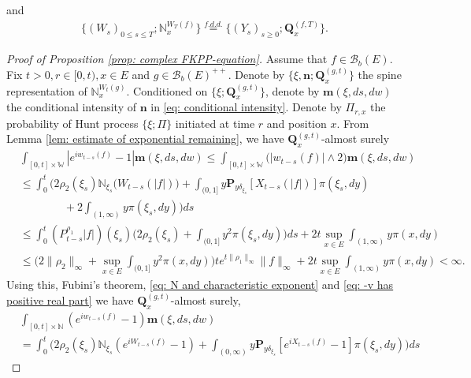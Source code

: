 \documentclass[12pt,a4paper]{amsart}
\theoremstyle{plain}
\theoremstyle{definition}
\numberwithin{equation}{section}
\begin{document}
    and
\begin{equation}\begin{split}
\label{eq: Spine decomposition 2}
    \{(W_s)_{0\leq s\leq T};\mathbb N_x^{W_T(f)}\}
    \overset{f.d.d.}{=} \{(Y_s)_{s \geq 0};\mathbf Q_x^{(f,T)}\}.
\end{split}\end{equation}

\begin{proof}[Proof of Proposition \ref{prop: complex FKPP-equation}]
    Assume that $f\in \mathcal B_b(E)$.
    Fix $t>0, r\in [0,t), x\in E$ and $g\in \mathcal B_b(E)^{++}$.
    Denote by $\{\xi, \mathbf n; \mathbf Q_x^{(g,t)}\}$ the spine representation of $\mathbb N_x^{W_t(g)}$.
    Conditioned on $\{\xi; \mathbf Q_x^{(g,t)}\}$, denote by $\mathbf m(\xi, ds,dw)$ the conditional intensity of $\mathbf n$ in \eqref{eq: conditional intensity}.
    Denote by $\Pi_{r,x}$ the probability of Hunt process $\{\xi; \Pi\}$ initiated at time $r$ and position $x$.
    From Lemma \ref{lem: estimate of exponential remaining}, we have $\mathbf Q^{(g,t)}_{x}$-almost surely
\begin{equation}\begin{split}
&\int_{[0,t]\times \mathbb W}|e^{i w_{t-s}(f)} - 1| \mathbf m(\xi, ds,dw)
    \leq \int_{[0,t]\times \mathbb W}\big(| w_{t-s}(f)| \wedge 2\big) \mathbf m(\xi, ds,dw)
    \\&\leq \int_0^t \Big(2\rho_2(\xi_s)\mathbb N_{\xi_s}\big( W_{t-s}(|f|)\big)  + \int_{(0,1]} y \mathbf P_{y \delta_{\xi_s}}[ X_{t-s}(|f|)] \pi(\xi_s,dy)
    \\&\qquad\qquad+ 2\int_{(1,\infty)}y\pi(\xi_s,dy)\Big) ds
     \\&\leq \int_0^t (P_{t-s}^{\rho_1} |f|)(\xi_s)\Big(2\rho_2(\xi_s)  + \int_{(0,1]} y^2 \pi(\xi_s,dy)\Big) ds + 2t \sup_{x\in E}\int_{(1,\infty)}y\pi(x,dy)
    \\&\leq \Big(2\|\rho_2\|_\infty +\sup_{x\in E}\int_{(0,1]} y^2 \pi(x,dy)\Big) t e^{t\|\rho_1\|_\infty}\|f\|_\infty + 2t \sup_{x\in E}\int_{(1,\infty)}y\pi(x,dy)
    < \infty.
\end{split}\end{equation}
    Using this, Fubini's theorem, \eqref{eq: N and characteristic exponent} and \eqref{eq: -v has positive real part} we have $\mathbf Q^{(g,t)}_{x}$-almost surely,
\begin{equation}\begin{split}
    &\int_{[0,t]\times \mathbb N}(e^{i w_{t-s}(f)} - 1) \mathbf m(\xi, ds,dw)
    \\&=\int_0^t \Big(2\rho_2(\xi_s)\mathbb N_{\xi_s}(e^{i W_{t-s}(f)} - 1)  + \int_{(0,\infty)} y \mathbf P_{y \delta_{\xi_s}}[e^{i X_{t-s}(f)} - 1] \pi(\xi_s,dy)\Big) ds

\end{split}
\end{equation}
\end{proof}
\end{document}
